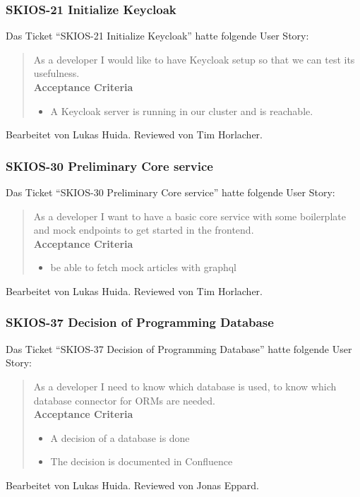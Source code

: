 \subsubsection{SKIOS-21 Initialize Keycloak}
Das Ticket \enquote{SKIOS-21 Initialize Keycloak} hatte folgende User Story:
\begin{quotation}
    As a developer I would like to have Keycloak setup so that we can test its usefulness. \\
    \textbf{Acceptance Criteria}
    \begin{itemize}
        \item A Keycloak server is running in our cluster and is reachable.
    \end{itemize}
\end{quotation}
Bearbeitet von Lukas Huida.
Reviewed von Tim Horlacher.

\subsubsection{SKIOS-30 Preliminary Core service}
Das Ticket \enquote{SKIOS-30 Preliminary Core service} hatte folgende User Story:
\begin{quotation}
    As a developer I want to have a basic core service with some boilerplate and mock endpoints to get started in the frontend. \\
    \textbf{Acceptance Criteria}
    \begin{itemize}
        \item be able to fetch mock articles with graphql
    \end{itemize}
\end{quotation}
Bearbeitet von Lukas Huida.
Reviewed von Tim Horlacher.

\subsubsection{SKIOS-37 Decision of Programming Database}
Das Ticket \enquote{SKIOS-37 Decision of Programming Database} hatte folgende User Story:
\begin{quotation}
    As a developer I need to know which database is used, to know which database connector for ORMs are needed. \\
    \textbf{Acceptance Criteria}
    \begin{itemize}
        \item A decision of a database is done
        \item The decision is documented in Confluence
    \end{itemize}
\end{quotation}
Bearbeitet von Lukas Huida.
Reviewed von Jonas Eppard.

